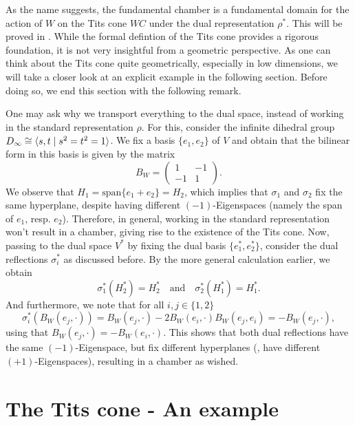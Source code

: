 As the name suggests, the fundamental chamber is a fundamental domain for the action of \(W\) on the Tits cone \(WC\) under the dual representation \(\rho^*\).
This will be proved in .
While the formal defintion of the Tits cone provides a rigorous foundation, it is not very insightful from a geometric perspective.
As one can think about the Tits cone quite geometrically, especially in low dimensions, we will take a closer look at an explicit example in the following section.
Before doing so, we end this section with the following remark.

\begin{remark} %
    One may ask why we transport everything to the dual space, instead of working in the standard representation \(\rho\).
    For this, consider the infinite dihedral group \(D_\infty \cong \langle s, t\;\vert\;s^2 = t^2 = 1\rangle\).
    We fix a basis \(\{e_1, e_2\}\) of \(V\) and obtain that the bilinear form in this basis is given by the matrix
    \begin{equation*}
        B_W = \begin{pmatrix}
            1  & -1 \\
            -1 & 1
        \end{pmatrix}.
    \end{equation*}
    We observe that \(H_1 = \text{span}\{e_1 + e_2\} = H_2\), which implies that \(\sigma_1\) and \(\sigma_2\) fix the same hyperplane, despite having different \((-1)\)-Eigenspaces (namely the span of \(e_1\), resp. \(e_2\)).
    Therefore, in general, working in the standard representation won't result in a chamber, giving rise to the existence of the Tits cone.
    Now, passing to the dual space \(V^*\) by fixing the dual basis \(\{e_1^*, e_2^*\}\), consider the dual reflections \(\sigma_i^*\) as discussed before.
    By the more general calculation earlier, we obtain
    \[\sigma_1^*(H_2^*) = H_2^* \quad\text{and}\quad \sigma_2^*(H_1^*) = H_1^*.\]
    And furthermore, we note that for all \(i,j\in\{1,2\}\)
    \[\sigma_i^*(B_W(e_j,\cdot)) = B_W(e_j,\cdot) - 2B_W(e_i,\cdot)B_W(e_j,e_i) = - B_W(e_j,\cdot),\]
    using that \(B_W(e_j,\cdot) = -B_W(e_i,\cdot)\).
    This shows that both dual reflections have the same \((-1)\)-Eigenspace, but fix different hyperplanes (\ie, have different \((+1)\)-Eigenspaces), resulting in a chamber as wished.
\end{remark}


\section{The Tits cone - An example} %


